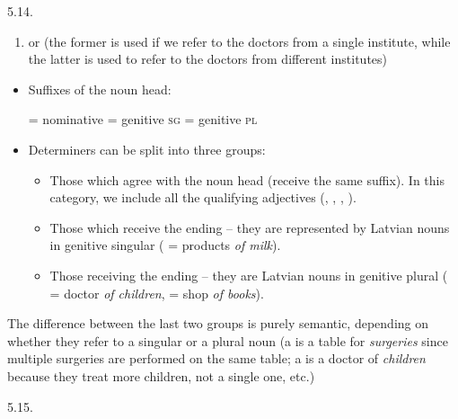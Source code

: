 \begin{refsection}
\begin{practiceproblemsolution}{5.14. \langnameLatvian}
\begin{solutions}[label=Solution 5.14\alph*]
        \begin{enumerate}[label = (\arabic*), start = 9]
        \item {} or  (the former is used if we refer to the doctors from a single institute, while the latter is used to refer to the doctors from different institutes)
    \end{enumerate}
\end{solutions}


\begin{itemize}
    \item Suffixes of the noun head:

  = nominative \hfill  {} = genitive \textsc{sg} \hfill {} = genitive \textsc{pl}
    \item Determiners can be split into three groups: 
    \begin{itemize}\sloppy
        \item Those which agree with the noun head (receive the same suffix). In this category, we include all the qualifying adjectives (, , , ).
        \item Those which receive the ending  -- they are represented by Latvian nouns in genitive singular ( = products \emph{of milk}).
        \item Those receiving the ending  -- they are Latvian nouns in genitive plural ( = doctor \emph{of children},  = shop \emph{of books}).
    \end{itemize}\end{itemize}

The difference between the last two groups is purely semantic, depending on whether they refer to a singular or a plural noun (a  is a table for \emph{surgeries} since multiple surgeries are performed on the same table; a  is a doctor of \emph{children} because they treat more children, not a single one, etc.)\\



\end{practiceproblemsolution}
\begin{practiceproblemsolution}{5.15. \langnameIlocano}

\begin{solutions}[label=Solution 5.15\alph*]
    \item 
    \begin{enumerate}


\end{enumerate}
\end{solutions}
\end{practiceproblemsolution}
\end{refsection}

